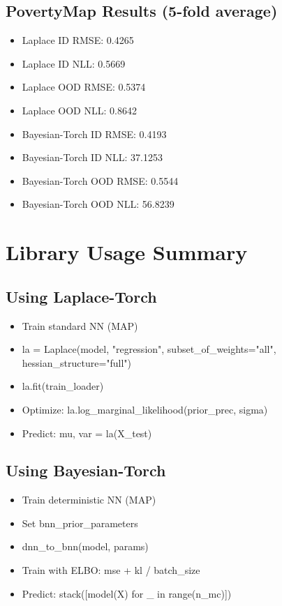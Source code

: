 \documentclass[11pt]{article}
\begin{document}
\subsection{PovertyMap Results (5-fold average)}
\begin{itemize}
\item Laplace ID RMSE: 0.4265
\item Laplace ID NLL: 0.5669
\item Laplace OOD RMSE: 0.5374
\item Laplace OOD NLL: 0.8642
\item Bayesian-Torch ID RMSE: 0.4193
\item Bayesian-Torch ID NLL: 37.1253
\item Bayesian-Torch OOD RMSE: 0.5544
\item Bayesian-Torch OOD NLL: 56.8239
\end{itemize}

\section{Library Usage Summary}

\subsection{Using Laplace-Torch}
\begin{itemize}
\item Train standard NN (MAP)
\item la = Laplace(model, "regression", subset\_of\_weights="all", hessian\_structure="full")
\item la.fit(train\_loader)
\item Optimize: la.log\_marginal\_likelihood(prior\_prec, sigma)
\item Predict: mu, var = la(X\_test)
\end{itemize}

\subsection{Using Bayesian-Torch}
\begin{itemize}
\item Train deterministic NN (MAP)
\item Set bnn\_prior\_parameters
\item dnn\_to\_bnn(model, params)
\item Train with ELBO: mse + kl / batch\_size
\item Predict: stack([model(X) for \_ in range(n\_mc)])
\end{itemize}
\end{document}
